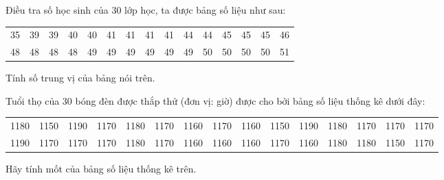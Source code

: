 \begin{bt}
	Điều tra số học sinh của 30 lớp học, ta được bảng số liệu như sau:
	\begin{center}
	\begin{tabular}{ccccccccccccccc}
		35 & 39 & 39 & 40 & 40 & 41 & 41 & 41 & 41 & 44 & 44 & 45 & 45 & 45 & 46 \\
		48 & 48 & 48 & 48 & 49 & 49 & 49 & 49 & 49 & 49 & 50 & 50 & 50 & 50 & 51
	\end{tabular}
	\end{center}
	Tính số trung vị của bảng nói trên.
\end{bt}

\begin{bt}
	Tuổi thọ của 30 bóng đèn được thắp thử (đơn vị: giờ) được cho bởi bảng số liệu thống kê dưới đây:
	\begin{center}
	\begin{tabular}{ccccccccccccccc}
		1180 & 1150 & 1190 & 1170 & 1180 & 1170 & 1160 & 1170 & 1160 & 1150 & 1190 & 1180 & 1170 & 1170 & 1170 \\
		1190 & 1170 & 1170 & 1170 & 1180 & 1170 & 1160 & 1160 & 1160 & 1170 & 1160 & 1180 & 1180 & 1150 & 1170
	\end{tabular}
	\end{center}
	Hãy tính mốt của bảng số liệu thống kê trên.
\end{bt}

